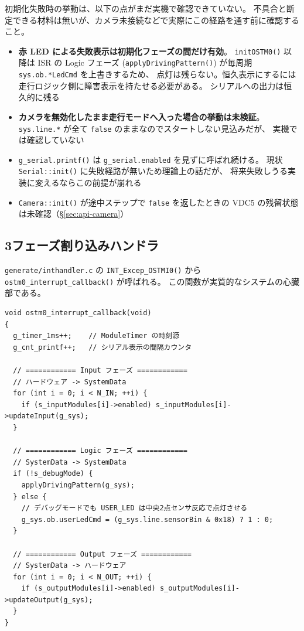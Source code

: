 \documentclass[a4paper,11pt,dvipdfmx]{jsarticle}
\begin{document}
\begin{cautionbox}
初期化失敗時の挙動は、以下の点がまだ実機で確認できていない。
不具合と断定できる材料は無いが、カメラ未接続などで実際にこの経路を通す前に確認すること。

\begin{itemize}[nosep, leftmargin=*]
  \item \textbf{赤 LED による失敗表示は初期化フェーズの間だけ有効}。
        \texttt{initOSTM0()} 以降は ISR の Logic フェーズ
        (\texttt{applyDrivingPattern()}) が毎周期 \texttt{sys.ob.*LedCmd} を上書きするため、
        点灯は残らない。恒久表示にするには走行ロジック側に障害表示を持たせる必要がある。
        シリアルへの出力は恒久的に残る
  \item \textbf{カメラを無効化したまま走行モードへ入った場合の挙動は未検証}。
        \texttt{sys.line.*} が全て \texttt{false} のままなのでスタートしない見込みだが、
        実機では確認していない
  \item \texttt{g\_serial.printf()} は \texttt{g\_serial.enabled} を見ずに呼ばれ続ける。
        現状 \texttt{Serial::init()} に失敗経路が無いため理論上の話だが、
        将来失敗しうる実装に変えるならこの前提が崩れる
  \item \texttt{Camera::init()} が途中ステップで \texttt{false} を返したときの
        VDC5 の残留状態は未確認（\hyperref[sec:api-camera]{§\ref*{sec:api-camera}}）
\end{itemize}
\end{cautionbox}

\subsection{3フェーズ割り込みハンドラ}\label{sec:isr}

\texttt{generate/inthandler.c} の \texttt{INT\_Excep\_OSTMI0()} から
\texttt{ostm0\_interrupt\_callback()} が呼ばれる。
この関数が実質的なシステムの心臓部である。

\begin{lstlisting}[caption={1ms 割り込みコールバック (mcr\_camera\_2026base.cpp)},label=lst:isr]
void ostm0_interrupt_callback(void)
{
  g_timer_1ms++;    // ModuleTimer の時刻源
  g_cnt_printf++;   // シリアル表示の間隔カウンタ

  // ============ Input フェーズ ============
  // ハードウェア -> SystemData
  for (int i = 0; i < N_IN; ++i) {
    if (s_inputModules[i]->enabled) s_inputModules[i]->updateInput(g_sys);
  }

  // ============ Logic フェーズ ============
  // SystemData -> SystemData
  if (!s_debugMode) {
    applyDrivingPattern(g_sys);
  } else {
    // デバッグモードでも USER_LED は中央2点センサ反応で点灯させる
    g_sys.ob.userLedCmd = (g_sys.line.sensorBin & 0x18) ? 1 : 0;
  }

  // ============ Output フェーズ ============
  // SystemData -> ハードウェア
  for (int i = 0; i < N_OUT; ++i) {
    if (s_outputModules[i]->enabled) s_outputModules[i]->updateOutput(g_sys);
  }
}
\end{lstlisting}
\end{document}
